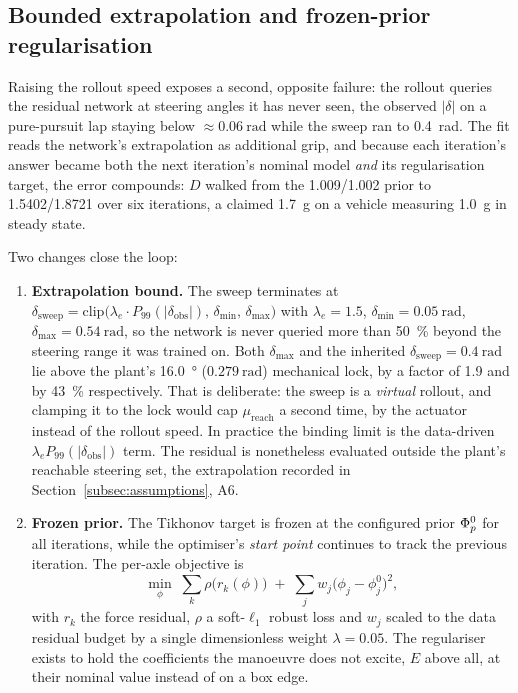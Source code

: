 \subsection{Bounded extrapolation and frozen-prior regularisation}
\label{subsec:iterative}

Raising the rollout speed exposes a second, opposite failure: the rollout
queries the residual network at steering angles it has never seen, the
observed $|\delta|$ on a pure-pursuit lap staying below
$\approx\SI{0.06}{\radian}$ while the sweep ran to \SI{0.4}{\radian}. The fit
reads the network's extrapolation as additional grip, and because each
iteration's answer became both the next iteration's nominal model \emph{and}
its regularisation target, the error compounds: $D$ walked from the
\num{1.009}/\num{1.002} prior to \num{1.5402}/\num{1.8721} over six iterations,
a claimed \SI{1.7}{\g} on a vehicle measuring \SI{1.0}{\g} in steady state.

Two changes close the loop:
\begin{enumerate}
\item \textbf{Extrapolation bound.} The sweep terminates at
$\delta_{\mathrm{sweep}}=\mathrm{clip}\big(\lambda_{e}\cdot
P_{99}(|\delta_{\mathrm{obs}}|),\,\delta_{\min},\,\delta_{\max}\big)$ with
$\lambda_{e}=1.5$, $\delta_{\min}=\SI{0.05}{\radian}$,
$\delta_{\max}=\SI{0.54}{\radian}$, so the network is never queried more than
\SI{50}{\percent} beyond the steering range it was trained on. Both
$\delta_{\max}$ and the inherited $\delta_{\mathrm{sweep}}=\SI{0.4}{\radian}$
lie above the plant's \SI{16.0}{\degree} ($\SI{0.279}{\radian}$) mechanical
lock, by a factor of \num{1.9} and by \SI{43}{\percent} respectively. That is
deliberate: the sweep is a \emph{virtual} rollout, and clamping it to the lock
would cap $\mu_{\mathrm{reach}}$ a second time, by the actuator instead of the
rollout speed. In practice the binding limit is the data-driven
$\lambda_{e}P_{99}(|\delta_{\mathrm{obs}}|)$ term. The residual is nonetheless
evaluated outside the plant's reachable steering set, the extrapolation
recorded in Section~\ref{subsec:assumptions}, A6.
\item \textbf{Frozen prior.} The Tikhonov target is frozen at the configured
prior $\Phi_{p}^{0}$ for all iterations, while the optimiser's \emph{start point}
continues to track the previous iteration. The per-axle objective is
\begin{equation}
\min_{\phi}\;\sum_{k}\rho\!\big(r_{k}(\phi)\big)\;+\;\sum_{j}w_{j}\big(\phi_{j}-\phi^{0}_{j}\big)^{2},
\label{eq:fitobj}
\end{equation}
with $r_{k}$ the force residual, $\rho$ a soft-$\ell_{1}$ robust loss and
$w_{j}$ scaled to the data residual budget by a single dimensionless weight
$\lambda=0.05$. The regulariser exists to hold the coefficients the manoeuvre
does not excite, $E$ above all, at their nominal value instead of on a box
edge.
\end{enumerate}

